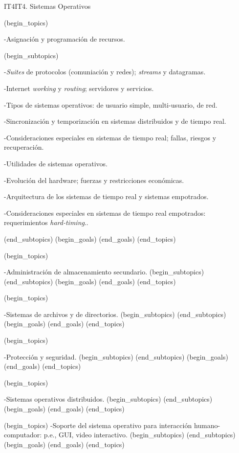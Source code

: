 \begin{BKL2}{IT4}{IT4. Sistemas Operativos}
 

(begin_topics)

-Asignación y programación de recursos.

(begin_subtopics)

-{\it Suites} de protocolos (comuniación y redes); {\it streams} y datagramas.

-Internet {\it working} y {\it routing}; servidores y servicios.

-Tipos de sistemas operativos: de usuario simple, multi-usuario, de red.

-Sincronización y temporización en sistemas distribuidos y de tiempo real.

-Consideraciones especiales en sistemas de tiempo real; fallas, riesgos y recuperación.

-Utilidades de sistemas operativos.

-Evolución del hardware; fuerzas y restricciones económicas.

-Arquitectura de los sistemas de tiempo real y sistemas empotrados.

-Consideraciones especiales en sistemas de tiempo real empotrados: requerimientos {\it hard-timing}..

(end_subtopics)
(begin_goals)
(end_goals)
(end_topics)

 

(begin_topics)

-Administración de almacenamiento secundario.
(begin_subtopics)
(end_subtopics)
(begin_goals)
(end_goals)
(end_topics)

 

(begin_topics)

-Sistemas de archivos y de directorios.
(begin_subtopics)
(end_subtopics)
(begin_goals)
(end_goals)
(end_topics)

 

(begin_topics)

-Protección y seguridad.
(begin_subtopics)
(end_subtopics)
(begin_goals)
(end_goals)
(end_topics)

 

(begin_topics)

-Sistemas operativos distribuidos.
(begin_subtopics)
(end_subtopics)
(begin_goals)
(end_goals)
(end_topics)

 

(begin_topics)
-Soporte del sistema operativo para interacción humano-computador: p.e., GUI, video interactivo.
(begin_subtopics)
(end_subtopics)
(begin_goals)
(end_goals)
(end_topics)


\end{BKL2}
